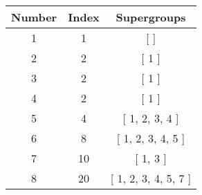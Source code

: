 \begin{center}
\begin{tabular}{|| c c c ||}
\hline
Number &  Index &  Supergroups
\\\hline
1 & 1 & [  ]
\\\hline
2 & 2 & [ 1 ]
\\\hline
3 & 2 & [ 1 ]
\\\hline
4 & 2 & [ 1 ]
\\\hline
5 & 4 & [ 1, 2, 3, 4 ]
\\\hline
6 & 8 & [ 1, 2, 3, 4, 5 ]
\\\hline
7 & 10 & [ 1, 3 ]
\\\hline
8 & 20 & [ 1, 2, 3, 4, 5, 7 ]
\\\hline
\end{tabular}
\end{center}
